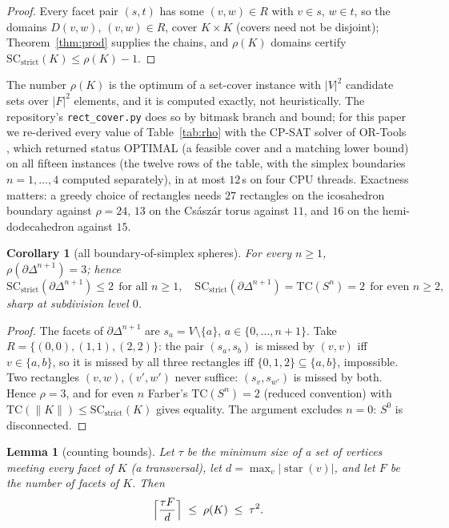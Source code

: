 \documentclass[12pt]{article}
\newcommand{\TC}{\mathrm{TC}}
\newcommand{\SC}{\mathrm{SC}}
\newcommand{\SCst}{\SC_{\mathrm{strict}}}
\newtheorem{lemma}[theo]{Lemma}
\newtheorem{corollary}[theo]{Corollary}
\begin{document}
\begin{proof}
Every facet pair $(s,t)$ has some $(v,w)\in R$ with $v\in s$, $w\in
t$, so the domains $D(v,w)$, $(v,w)\in R$, cover $K\times K$ (covers
need not be disjoint); Theorem~\ref{thm:prod} supplies the chains, and
$\rho(K)$ domains certify $\SCst(K)\le\rho(K)-1$.
\end{proof}

The number $\rho(K)$ is the optimum of a set-cover instance with
$|V|^2$ candidate sets over $|F|^2$ elements, and it is computed
exactly, not heuristically.  The repository's \texttt{rect\_cover.py}
does so by bitmask branch and bound; for this paper we re-derived every
value of Table~\ref{tab:rho} with the CP-SAT solver of OR-Tools
\cite{ORTools}, which returned status OPTIMAL (a feasible cover and a
matching lower bound) on all fifteen instances (the twelve rows of the table, with the simplex
boundaries $n=1,\dots,4$ computed separately), in at most $12$\,s on four
CPU threads.  Exactness matters: a greedy choice of rectangles needs
$27$ rectangles on the icosahedron boundary against $\rho=24$, $13$ on
the Cs\'asz\'ar torus against $11$, and $16$ on the hemi-dodecahedron
against $15$.

\begin{corollary}[all boundary-of-simplex spheres]\label{cor:spheres}
For every $n\ge1$, $\rho(\partial\Delta^{n+1})=3$; hence
\[
\SCst(\partial\Delta^{n+1})\le 2\ \ \text{for all }n\ge1,
\quad
\SCst(\partial\Delta^{n+1})=\TC(S^n)=2\ \ \text{for even }n\ge2,
\]
sharp at subdivision level $0$.
\end{corollary}

\begin{proof}
The facets of $\partial\Delta^{n+1}$ are $s_a=V\setminus\{a\}$,
$a\in\{0,\dots,n+1\}$.  Take $R=\{(0,0),(1,1),(2,2)\}$: the pair
$(s_a,s_b)$ is missed by $(v,v)$ iff $v\in\{a,b\}$, so it is missed by
all three rectangles iff $\{0,1,2\}\subseteq\{a,b\}$, impossible.  Two
rectangles $(v,w),(v',w')$ never suffice: $(s_v,s_{w'})$ is missed by
both.  Hence $\rho=3$, and for even $n$ Farber's $\TC(S^n)=2$
\cite{F03} (reduced convention) with $\TC(\|K\|)\le\SCst(K)$
\cite{G18} gives equality.  The argument excludes $n=0$: $S^0$ is
disconnected.
\end{proof}

\begin{lemma}[counting bounds]\label{lem:rows}
Let $\tau$ be the minimum size of a set of vertices meeting every facet
of $K$ (a \emph{transversal}), let $d=\max_v|\operatorname{star}(v)|$,
and let $F$ be the number of facets of $K$.  Then
\[
\Bigl\lceil \frac{\tau F}{d}\Bigr\rceil\;\le\;\rho(K)\;\le\;\tau^{2}.
\]
\end{lemma}
\end{document}
